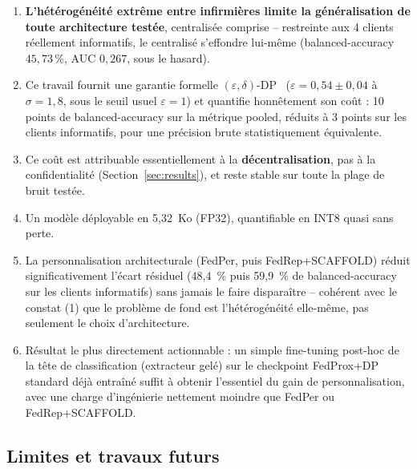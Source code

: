 \documentclass{acmart}
\begin{document}
\begin{enumerate}[leftmargin=1.2em]
\item \textbf{L'hétérogénéité extrême entre infirmières limite la généralisation de
toute architecture testée}, centralisée comprise -- restreinte aux 4 clients
réellement informatifs, le centralisé s'effondre lui-même (balanced-accuracy
$45{,}73\,\%$, AUC $0{,}267$, sous le hasard).
\item Ce travail fournit une garantie formelle $(\varepsilon,\delta)$-DP~\cite{dwork2014foundations}
($\varepsilon=0{,}54\pm0{,}04$ à $\sigma=1{,}8$, sous le seuil usuel $\varepsilon=1$)
et quantifie honnêtement son coût : 10 points de balanced-accuracy sur la métrique
pooled, réduits à 3 points sur les clients informatifs, pour une précision brute
statistiquement équivalente.
\item Ce coût est attribuable essentiellement à la \textbf{décentralisation}, pas à la
confidentialité (Section~\ref{sec:results}), et reste stable sur toute la plage de
bruit testée.
\item Un modèle déployable en 5,32~Ko (FP32), quantifiable en INT8 quasi sans perte.
\item La personnalisation architecturale (FedPer, puis FedRep+SCAFFOLD) réduit
significativement l'écart résiduel (48,4~\% puis 59,9~\% de balanced-accuracy sur les
clients informatifs) sans jamais le faire disparaître -- cohérent avec le constat (1)
que le problème de fond est l'hétérogénéité elle-même, pas seulement le choix
d'architecture.
\item Résultat le plus directement actionnable : un simple fine-tuning post-hoc de la
tête de classification (extracteur gelé) sur le checkpoint FedProx+DP standard déjà
entraîné suffit à obtenir l'essentiel du gain de personnalisation, avec une charge
d'ingénierie nettement moindre que FedPer ou FedRep+SCAFFOLD.
\end{enumerate}

\subsection{Limites et travaux futurs}
\end{document}

